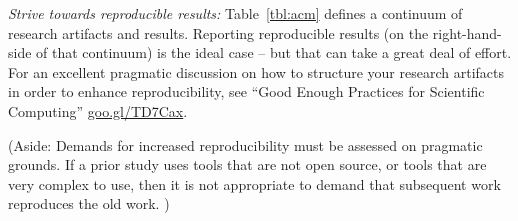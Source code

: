\documentclass[preprint,10pt]{elsarticle}
\newcommand{\RED}{\color{red}}
\newcommand{\BLACK}{\color{black}}
\begin{document}
{\em Strive towards reproducible results:}
Table~\ref{tbl:acm} defines a continuum of research artifacts and results.  Reporting reproducible results (on the right-hand-side of that continuum) is the ideal case -- but that can take a great deal of effort.  
For an excellent pragmatic discussion on how to structure your research artifacts in order to enhance reproducibility, see ``Good Enough Practices for Scientific Computing''  \href{http://goo.gl/TD7Cax}{goo.gl/TD7Cax}.

\RED(Aside: Demands for increased reproducibility  must be assessed on pragmatic grounds.
If a prior study uses tools that are not open source, or tools that are very complex to use, then it is not appropriate
to demand that subsequent work reproduces the old work. )\label{noreprod} \BLACK
\end{document}
